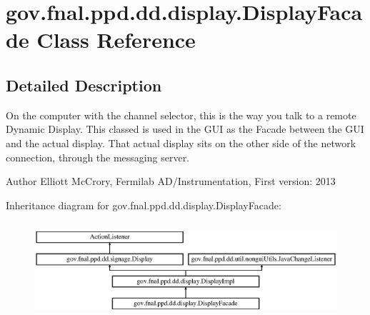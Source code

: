 \hypertarget{classgov_1_1fnal_1_1ppd_1_1dd_1_1display_1_1DisplayFacade}{\section{gov.\-fnal.\-ppd.\-dd.\-display.\-Display\-Facade Class Reference}
\label{classgov_1_1fnal_1_1ppd_1_1dd_1_1display_1_1DisplayFacade}
}


\subsection{Detailed Description}
On the computer with the channel selector, this is the way you talk to a remote Dynamic Display. This classed is used in the G\-U\-I as the Facade between the G\-U\-I and the actual display. That actual display sits on the other side of the network connection, through the messaging server.

\begin{DoxyAuthor}{Author}
Elliott Mc\-Crory, Fermilab A\-D/\-Instrumentation, First version\-: 2013 
\end{DoxyAuthor}
Inheritance diagram for gov.\-fnal.\-ppd.\-dd.\-display.\-Display\-Facade\-:\begin{figure}[H]
\begin{center}
\leavevmode
\includegraphics[height=3.555556cm]{classgov_1_1fnal_1_1ppd_1_1dd_1_1display_1_1DisplayFacade}
\end{center}
\end{figure}
